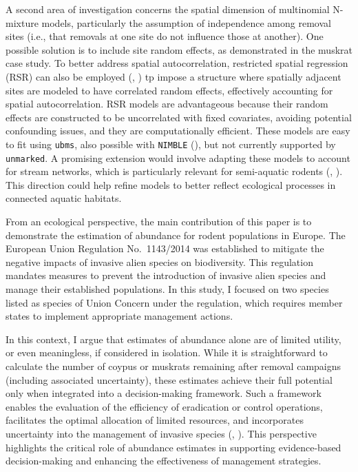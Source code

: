 \documentclass[
  11pt,
  a4paper,
]{article}
\begin{document}
A second area of investigation concerns the spatial dimension of multinomial N-mixture models, particularly the assumption of independence among removal sites (i.e., that removals at one site do not influence those at another). One possible solution is to include site random effects, as demonstrated in the muskrat case study. To better address spatial autocorrelation, restricted spatial regression (RSR) can also be employed (, ) tp impose a structure where spatially adjacent sites are modeled to have correlated random effects, effectively accounting for spatial autocorrelation. RSR models are advantageous because their random effects are constructed to be uncorrelated with fixed covariates, avoiding potential confounding issues, and they are computationally efficient. These models are easy to fit using \texttt{ubms}, also possible with \texttt{NIMBLE} (), but not currently supported by \texttt{unmarked}. A promising extension would involve adapting these models to account for stream networks, which is particularly relevant for semi-aquatic rodents (, ). This direction could help refine models to better reflect ecological processes in connected aquatic habitats.

From an ecological perspective, the main contribution of this paper is to demonstrate the estimation of abundance for rodent populations in Europe. The European Union Regulation No.~1143/2014 was established to mitigate the negative impacts of invasive alien species on biodiversity. This regulation mandates measures to prevent the introduction of invasive alien species and manage their established populations. In this study, I focused on two species listed as species of Union Concern under the regulation, which requires member states to implement appropriate management actions.

In this context, I argue that estimates of abundance alone are of limited utility, or even meaningless, if considered in isolation. While it is straightforward to calculate the number of coypus or muskrats remaining after removal campaigns (including associated uncertainty), these estimates achieve their full potential only when integrated into a decision-making framework. Such a framework enables the evaluation of the efficiency of eradication or control operations, facilitates the optimal allocation of limited resources, and incorporates uncertainty into the management of invasive species (, ). This perspective highlights the critical role of abundance estimates in supporting evidence-based decision-making and enhancing the effectiveness of management strategies.
\end{document}
